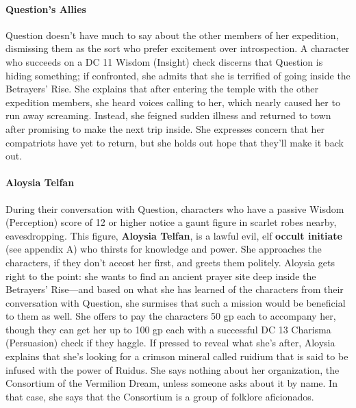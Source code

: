 \documentclass[10pt,a4,twoside,twocolumn,openany,nodeprecatedcode]{dndbook}
\begin{document}
\paragraph{Question's Allies}
Question doesn't have much to say about the other members of her expedition, dismissing them as the sort who prefer excitement over introspection. A character who succeeds on a DC 11 Wisdom (Insight) check discerns that Question is hiding something; if confronted, she admits that she is terrified of going inside the Betrayers' Rise. She explains that after entering the temple with the other expedition members, she heard voices calling to her, which nearly caused her to run away screaming. Instead, she feigned sudden illness and returned to town after promising to make the next trip inside. She expresses concern that her compatriots have yet to return, but she holds out hope that they'll make it back out.
\paragraph{Aloysia Telfan}
During their conversation with Question, characters who have a passive Wisdom (Perception) score of 12 or higher notice a gaunt figure in scarlet robes nearby, eavesdropping. This figure, \textbf{Aloysia Telfan}, is a lawful evil, elf \textbf{occult initiate} (see appendix A) who thirsts for knowledge and power. She approaches the characters, if they don't accost her first, and greets them politely.
Aloysia gets right to the point: she wants to find an ancient prayer site deep inside the Betrayers' Rise—and based on what she has learned of the characters from their conversation with Question, she surmises that such a mission would be beneficial to them as well. She offers to pay the characters 50 gp each to accompany her, though they can get her up to 100 gp each with a successful DC 13 Charisma (Persuasion) check if they haggle. If pressed to reveal what she's after, Aloysia explains that she's looking for a crimson mineral called ruidium that is said to be infused with the power of Ruidus. She says nothing about her organization, the Consortium of the Vermilion Dream, unless someone asks about it by name. In that case, she says that the Consortium is a group of folklore aficionados.
\end{document}
